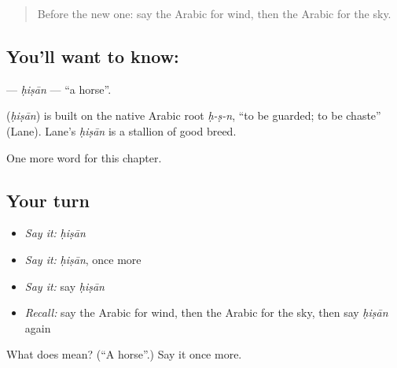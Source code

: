 \label{lesson:AR-C78-hisan}



\begin{quote}
Before the new one: say the Arabic for wind, then the Arabic for the sky.
\end{quote}

\subsection*{You'll want to know: }
\textbf{} — \emph{ḥiṣān} — \textquotedblleft{}a horse\textquotedblright{}.

\begin{cousinweb}
\textbf{} (\emph{ḥiṣān}) is built on the native Arabic root \emph{ḥ-ṣ-n}, \textquotedblleft{}to be guarded; to be chaste\textquotedblright{} (Lane). Lane's \emph{ḥiṣān} is a stallion of good breed.
\end{cousinweb}

\begin{grammarlens}[title={What you've built}]
One more word for this chapter.
\end{grammarlens}

\subsection*{Your turn}
\begin{itemize}
\raggedright
  \item \emph{Say it:} \emph{ḥiṣān}
  \item \emph{Say it:} \emph{ḥiṣān}, once more
  \item \emph{Say it:} say \emph{ḥiṣān}
  \item \emph{Recall:} say the Arabic for wind, then the Arabic for the sky, then say \emph{ḥiṣān} again
\end{itemize}

\begin{tcolorbox}[breakable,colback=teal!4,colframe=teal!35!black,title={Before you move on}]
What does  mean? (\textquotedblleft{}A horse\textquotedblright{}.) Say it once more.
\end{tcolorbox}
